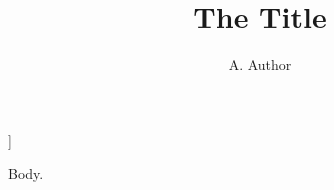 \documentclass{article}
\title{The Title}
\author{A. Author}
\begin{document}
]
\maketitle
Body.
\end{document}

